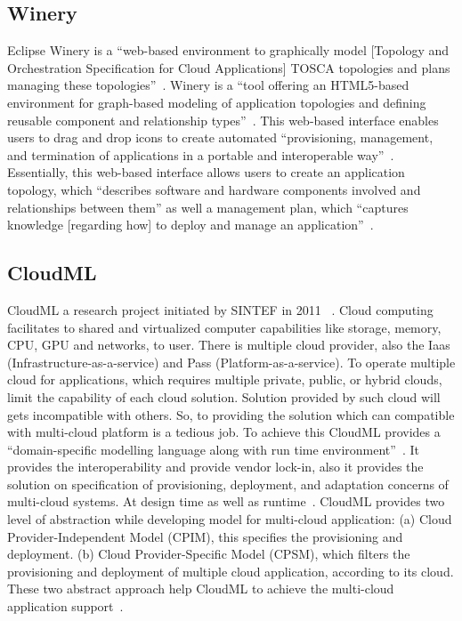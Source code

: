 {\subsection{Winery \cv}

Eclipse Winery is a ``web-based environment to graphically model
[Topology and Orchestration Specification for Cloud Applications]
TOSCA topologies and plans managing these
topologies''~\cite{www-winery}. Winery is a ``tool offering an
HTML5-based environment for graph-based modeling of application
topologies and defining reusable component and relationship
types''~\cite{winery-paper-2013}. This web-based interface enables
users to drag and drop icons to create automated ``provisioning,
management, and termination of applications in a portable and
interoperable way''~\cite{winery-paper-2013}.  Essentially, this
web-based interface allows users to create an application topology,
which ``describes software and hardware components involved and
relationships between them'' as well a management plan, which
``captures knowledge [regarding how] to deploy and manage an
application''~\cite{winery-paper-2013}.

     \pv
     

\subsection{CloudML}
                                                            
CloudML a research project initiated by SINTEF in 2011
~\cite{www-cloudml}. Cloud computing facilitates to shared and
virtualized computer capabilities like storage, memory, CPU, GPU and
networks, to user. There is multiple cloud provider, also the Iaas
(Infrastructure-as-a-service) and Pass (Platform-as-a-service). To
operate multiple cloud for applications, which requires multiple
private, public, or hybrid clouds, limit the capability of each cloud
solution.  Solution provided by such cloud will gets incompatible with
others. So, to providing the solution which can compatible with
multi-cloud platform is a tedious job. To achieve this CloudML
provides a ``domain-specific modelling language along with run time
environment''~\cite{www-cloudml}. It provides the interoperability and
provide vendor lock-in, also it provides the solution on specification
of provisioning, deployment, and adaptation concerns of multi-cloud
systems. At design time as well as runtime~\cite{www-cloudml}.
CloudML provides two level of abstraction while developing model for
multi-cloud application: (a) Cloud Provider-Independent Model (CPIM),
this specifies the provisioning and deployment.  (b) Cloud
Provider-Specific Model (CPSM), which filters the provisioning and
deployment of multiple cloud application, according to its cloud.
These two abstract approach help CloudML to achieve the multi-cloud
application support~\cite{www-cloudmlwiki}.

}
